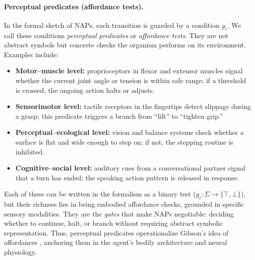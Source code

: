 \paragraph{Perceptual predicates (affordance tests).}
In the formal sketch of NAPs, each transition is guarded by a condition $g_i$. 
We call these conditions \emph{perceptual predicates} or \emph{affordance tests}. 
They are not abstract symbols but concrete checks the organism performs on its environment. 
Examples include:
\begin{itemize}
  \item \textbf{Motor–muscle level:} proprioceptors in flexor and extensor muscles signal whether the current joint angle or tension is within safe range; if a threshold is crossed, the ongoing action halts or adjusts. 
  \item \textbf{Sensorimotor level:} tactile receptors in the fingertips detect slippage during a grasp; this predicate triggers a branch from “lift” to “tighten grip.” 
  \item \textbf{Perceptual–ecological level:} vision and balance systems check whether a surface is flat and wide enough to step on; if not, the stepping routine is inhibited. 
  \item \textbf{Cognitive–social level:} auditory cues from a conversational partner signal that a turn has ended; the speaking action pattern is released in response.
\end{itemize}
Each of these can be written in the formalism as a binary test ($g_i:\Sigma \to \{\top,\bot\}$), but their richness lies in being embodied affordance checks, grounded in specific sensory modalities. 
They are the \emph{gates} that make NAPs negotiable: deciding whether to continue, halt, or branch without requiring abstract symbolic representation. 
Thus, perceptual predicates operationalize Gibson’s idea of affordances \citep{Gibson1979}, anchoring them in the agent’s bodily architecture and neural physiology.

